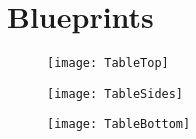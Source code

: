\chapter{Blueprints}\label{blueprint}
\begin{figure}[h]
\texttt{[image: TableTop]}
\end{figure}

\begin{figure}
\texttt{[image: TableSides]}
\end{figure}

\begin{figure}
\texttt{[image: TableBottom]}
\end{figure}